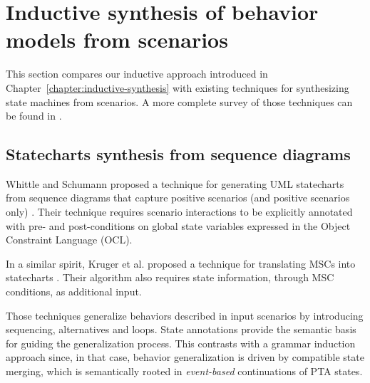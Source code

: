 \section{Inductive synthesis of behavior models from scenarios\label{section:related-from-scenarios}}

This section compares our inductive approach introduced in Chapter~\ref{chapter:inductive-synthesis} with existing techniques for synthesizing state machines from scenarios. A more complete survey of those techniques can be found in \cite{Liang:2006}.


\subsection{Statecharts synthesis from sequence diagrams}

Whittle and Schumann proposed a technique for generating UML statecharts from sequence diagrams that capture positive scenarios (and positive scenarios only) \cite{Whittle:2000}. Their technique requires scenario interactions to be explicitly annotated with pre- and post-conditions on global state variables expressed in the Object Constraint Language (OCL). 

In a similar spirit, Kruger et al. proposed a technique for translating MSCs into statecharts \cite{Kruger:2000}. Their algorithm also requires state information, through MSC conditions, as additional input.

Those techniques generalize behaviors described in input scenarios by introducing sequencing, alternatives and loops. State annotations provide the semantic basis for guiding the generalization process. This contrasts with a grammar induction approach since, in that case, behavior generalization is driven by compatible state merging, which is semantically rooted in \emph{event-based} continuations of PTA states. 

